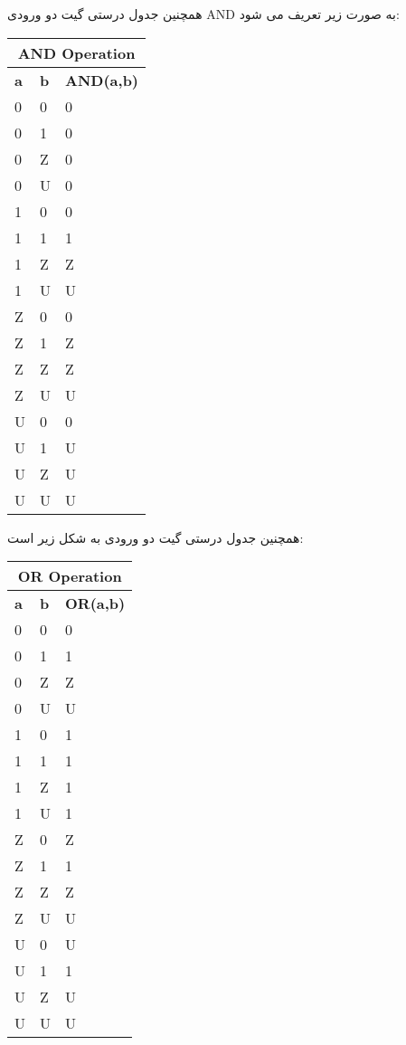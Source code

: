 همچنین جدول درستی گیت دو ورودی AND به صورت زیر تعریف می شود: 

\begin{latin}
\begin{center}
\begin{tabular}{ |p{3cm}|p{3cm}|p{3cm}| }
\hline
\multicolumn{3}{|c|}{AND Operation} \\
\hline
\textbf{a} & \textbf{b} & \textbf{AND(a,b)} \\
\hline
0 & 0 & 0 \\
0 & 1 & 0 \\
0 & Z & 0 \\
0 & U & 0 \\
1 & 0 & 0 \\
1 & 1 & 1 \\
1 & Z & Z \\
1 & U & U \\
Z & 0 & 0 \\
Z & 1 & Z \\
Z & Z & Z \\
Z & U & U \\
U & 0 & 0 \\
U & 1 & U \\
U & Z & U \\
U & U & U \\
\hline
\end{tabular}
\end{center}
\end{latin}

همچنین جدول درستی گیت 
دو ورودی به شکل زیر است:

\begin{latin}
\begin{center}
\begin{tabular}{ |p{3cm}|p{3cm}|p{3cm}| }
\hline
\multicolumn{3}{|c|}{OR Operation} \\
\hline
\textbf{a} & \textbf{b} & \textbf{OR(a,b)} \\
\hline
0 & 0 & 0 \\
0 & 1 & 1 \\
0 & Z & Z \\
0 & U & U \\
1 & 0 & 1 \\
1 & 1 & 1 \\
1 & Z & 1 \\
1 & U & 1 \\
Z & 0 & Z \\
Z & 1 & 1 \\
Z & Z & Z \\
Z & U & U \\
U & 0 & U \\
U & 1 & 1 \\
U & Z & U \\
U & U & U \\
\hline
\end{tabular}
\end{center}
\end{latin}

